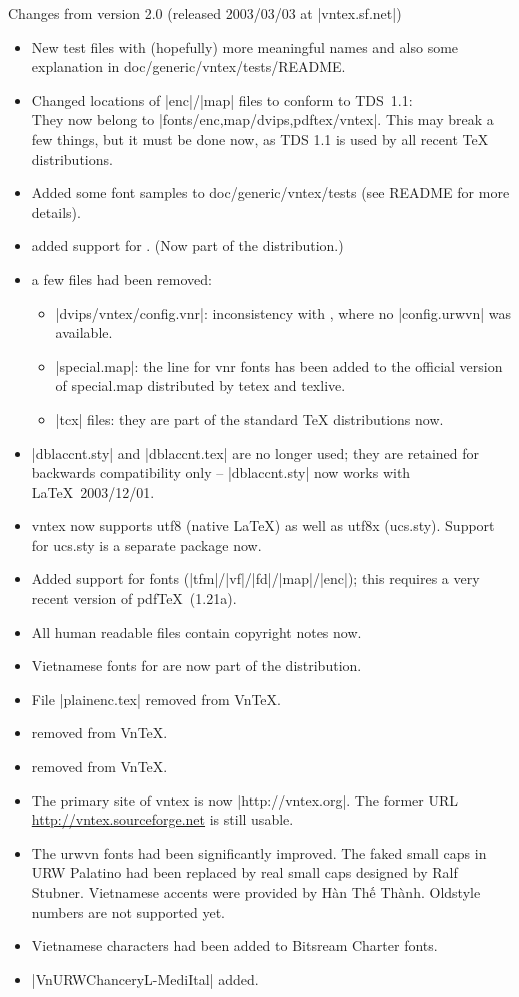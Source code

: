 \begin{releasenotes}
Changes from version 2.0 (released 2003/03/03 at |vntex.sf.net|)
\begin{itemize}
\item New test files with (hopefully) more meaningful names and also some
  explanation in doc/generic/vntex/tests/README.
\item Changed locations of |enc|/|map| files to conform to TDS~1.1:\\
  They now belong to |fonts/{enc,map}/{dvips,pdftex}/vntex|.  This may
  break a few things, but it must be done now, as TDS 1.1 is used by
  all recent TeX distributions.
\item Added some font samples to doc/generic/vntex/tests (see README
  for more details).
\item added support for . (Now part of the 
  distribution.)
\item a few files had been removed:
  \begin{itemize}
  \item |dvips/vntex/config.vnr|: inconsistency with ,
    where no |config.urwvn| was available.
  \item |special.map|: the line for vnr fonts has been added to the
    official version of special.map distributed by tetex and texlive.
  \item |tcx| files: they are part of the standard TeX distributions
    now.
  \end{itemize}
\item |dblaccnt.sty| and |dblaccnt.tex| are no longer used; they are
  retained for backwards compatibility only -- |dblaccnt.sty| now
  works with \LaTeX~2003/12/01.
\item vntex now supports utf8 (native LaTeX) as well as utf8x (ucs.sty).
  Support for ucs.sty is a separate package now.
\item Added support for  fonts
  (|tfm|/|vf|/|fd|/|map|/|enc|); this requires a very recent version
  of pdf\TeX~(1.21a).
\item All human readable files contain copyright notes now.
\item Vietnamese fonts for  are now part of the
   distribution. 
\item File |plainenc.tex| removed from Vn\TeX.
\item {} removed from Vn\TeX.
\item {} removed from Vn\TeX.
\item The primary site of vntex is now |http://vntex.org|.  The
  former URL \url{http://vntex.sourceforge.net} is still usable.
\item The urwvn fonts had been significantly improved.  The faked
  small caps in URW Palatino had been replaced by real small caps
  designed by Ralf Stubner.  Vietnamese accents were provided by
  Hàn Thế Thành.  Oldstyle numbers are not supported yet.
\item Vietnamese characters had been added to Bitsream Charter fonts.
\item |VnURWChanceryL-MediItal| added.
\end{itemize}

\end{releasenotes}

